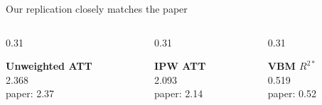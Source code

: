 \documentclass[aspectratio=169,10pt]{ctexbeamer}
\begin{document}
\begin{frame}{Our replication closely matches the paper}
  \vspace{0.15cm}
  \begin{columns}[T,totalwidth=\textwidth]
    \begin{column}{0.31\textwidth}
      \begin{bluebox}
        \centering
        \textbf{Unweighted ATT}\\[0.45em]
        {\Huge 2.368}\\[0.35em]
        \small paper: 2.37
      \end{bluebox}
    \end{column}
    \begin{column}{0.31\textwidth}
      \begin{bluebox}
        \centering
        \textbf{IPW ATT}\\[0.45em]
        {\Huge 2.093}\\[0.35em]
        \small paper: 2.14
      \end{bluebox}
    \end{column}
    \begin{column}{0.31\textwidth}
      \begin{bluebox}
        \centering
        \textbf{VBM $R^{2*}$}\\[0.45em]
        {\Huge 0.519}\\[0.35em]
        \small paper: 0.52
      \end{bluebox}
    \end{column}
  \end{columns}
\end{frame}
\end{document}
